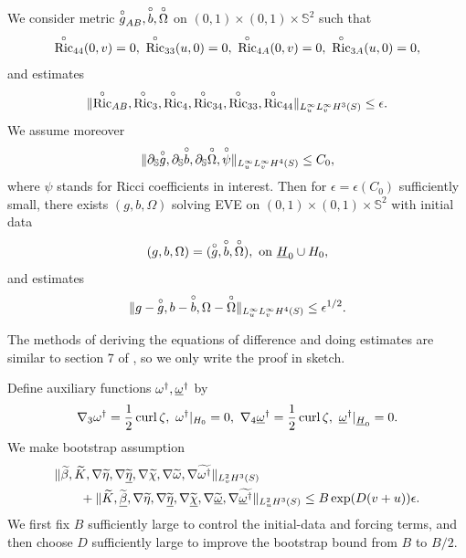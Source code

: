 \begin{theorem}
    We consider metric $\overset{\circ}{g}_{AB},\overset{\circ}{b},\overset{\circ}{\Omega}$ on $(0, 1)\times (0,1)\times \mathbb{S}^2$ such that
    \[\oc{\Rc}_{44}(0,v)=0,\ \oc{\Rc}_{33}(u,0)=0,\ \oc{\Rc}_{4A}(0,v)=0,\ \oc{\Rc}_{3A}(u,0)=0,\]
    and estimates 
    \begin{equation}
        \|\overset{\circ}{\operatorname{Ric}}_{AB},\overset{\circ}{\operatorname{Ric}}_3,\overset{\circ}{\operatorname{Ric}}_4,\overset{\circ}{\operatorname{Ric}}_{34},\overset{\circ}{\operatorname{Ric}}_{33},\overset{\circ}{\operatorname{Ric}}_{44}\|_{L^\infty_uL^\infty_vH^3(S)}\leq \epsilon.
    \end{equation}
    We assume moreover 
    \begin{equation}
        \| \partial_{\mathbb{S}}\overset{\circ}{g}, \partial_{\mathbb{S}}\overset{\circ}{b}, \partial_{\mathbb{S}}\overset{\circ}\Omega, \overset{\circ}{\psi}\|_{L^\infty_u L^\infty_v H^4(S)} \leq C_0,
    \end{equation}
    where $\psi$ stands for Ricci coefficients in interest.
    Then for $\epsilon=\epsilon(C_0)$ sufficiently small, there exists $(g,b,\Omega)$ solving EVE on $( 0,1)\times (0,1)\times \mathbb{S}^2$ with initial data 
    \[(g,b,\Omega)=(\overset{\circ}{g},\overset{\circ}{b},\overset{\circ}\Omega),\ {\rm on}\ \underline H_0\cup H_{0},\]
    and estimates
    \begin{equation}
        \|g-\overset{\circ}{g},b-\overset{\circ}{b},\Omega-\overset{\circ}{\Omega}\|_{L^\infty_u L^\infty_v H^4(S)}\leq \epsilon^{1/2}.
    \end{equation}
\end{theorem}

The methods of deriving the equations of difference and doing estimates are similar to section 7 of \cite{an-26},
so we only write the proof in sketch. 

Define auxiliary functions $\omega^\dagger,\underline\omega^\dagger$ by
\[\nabla_3\omega^\dagger=\frac{1}{2}\cl\zeta,\ \omega^\dagger|_{H_0}=0,\ \nabla_4\omegab^\dagger=\frac{1}{2}\cl\zeta,\ \omegab^\dagger|_{\Hb_0}=0.\]
We make bootstrap assumption
\begin{equation*}
    \begin{aligned}
        &\|\widetilde{\beta},\widetilde{K},\nabla\widetilde\eta,\nabla\widetilde{\underline\eta},\nabla\widetilde{\chi},\nabla\widetilde{\omega},\nabla\widetilde{\omega^\dagger}\|_{L^2_vH^3(S)}\\
        &\qquad+\|\widetilde{K},\widetilde{\underline\beta},\nabla\widetilde{\eta},\nabla\widetilde{\underline\eta},\nabla\widetilde{\underline\chi},\nabla\widetilde{\underline\omega},\nabla\widetilde{\underline\omega^\dagger}\|_{L^2_uH^3(S)}\leq B\exp(D(v+u))\epsilon.
    \end{aligned}
\end{equation*}
We first fix $B$ sufficiently large to control the initial-data and forcing terms, and then choose $D$ sufficiently large to improve the bootstrap bound from $B$ to $B/2$.

